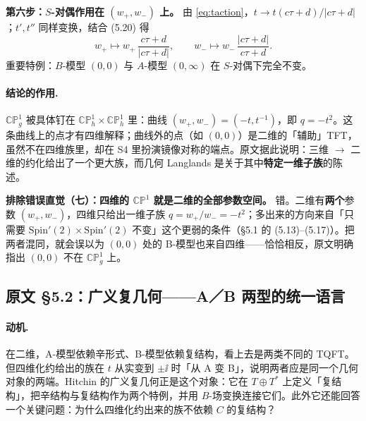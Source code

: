 \textbf{第六步：$S$-对偶作用在 $(w_+,w_-)$ 上。} 由 \eqref{eq:taction}，$t\to t(c\tau+d)/|c\tau+d|$；$t',t''$ 同样变换，结合 (5.20) 得\pA{}
\begin{equation}
w_+\longmapsto w_+\,\frac{c\tau+d}{|c\tau+d|},
\qquad
w_-\longmapsto w_-\,\frac{|c\tau+d|}{c\tau+d}.
\label{eq:Sww}
\end{equation}
重要特例：$B$-模型 $(0,0)$ 与 $A$-模型 $(0,\infty)$ 在 $S$-对偶下完全不变\pA{}。

\paragraph{结论的作用.}
$\mathbb{CP}^1_g$ 被具体钉在 $\mathbb{CP}^1_h\times\mathbb{CP}^1_h$ 里：曲线 $(w_+,w_-)=(-t,t^{-1})$，即 $q=-t^2$。这条曲线上的点才有四维解释；曲线外的点（如 $(0,0)$）是二维的「辅助」TFT，虽然不在四维族里，却在 S4 里扮演镜像对称的端点。原文据此说明：三维 $\to$ 二维的约化给出了一个更大族，而几何 Langlands 是关于其中\textbf{特定一维子族}的陈述\pA{}。

\begin{warn}
\textbf{排除错误直觉（七）：四维的 $\mathbb{CP}^1$ 就是二维的全部参数空间。} 错。二维有\textbf{两个}参数 $(w_+,w_-)$，四维只给出一维子族 $q=w_+/w_-=-t^2$；多出来的方向来自「只需要 $\mathrm{Spin}'(2)\times\mathrm{Spin}'(2)$ 不变」这个更弱的条件（§5.1 的 (5.13)–(5.17)）\pA{}。把两者混同，就会误以为 $(0,0)$ 处的 B-模型也来自四维——恰恰相反，原文明确指出 $(0,0)$ 不在 $\mathbb{CP}^1_g$ 上\pA{}。
\end{warn}


\subsection{原文 §5.2：广义复几何——A／B 两型的统一语言}

\paragraph{动机.}
在二维，A-模型依赖辛形式、B-模型依赖复结构，看上去是两类不同的 TQFT。但四维化约给出的族在 $t$ 从实变到 $\pm\ii$ 时「从 A 变 B」，说明两者应是同一个几何对象的两端。Hitchin 的广义复几何正是这个对象：它在 $T\oplus T^*$ 上定义「复结构」，把辛结构与复结构作为两个特例，并用 $B$-场变换连接它们\pA{}。此外它还能回答一个关键问题：为什么四维化约出来的族不依赖 $C$ 的复结构？

